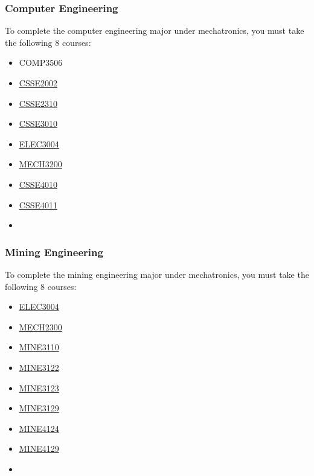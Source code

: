 \subsubsection{Computer Engineering}
To complete the computer engineering major under mechatronics, you must take the following 8 courses:
\begin{multicols}{3}
    \begin{itemize}
        \item COMP3506
        \item \hyperlink{CSSE2002}{CSSE2002}
        \item \hyperlink{CSSE2310}{CSSE2310}
        \item \hyperlink{CSSE3010}{CSSE3010}
        \item \hyperlink{ELEC3004}{ELEC3004}
        \item \hyperlink{MECH3200}{MECH3200}
        \item \hyperlink{CSSE4010}{CSSE4010}
        \item \hyperlink{CSSE4011}{CSSE4011}
        \item[]
    \end{itemize}
\end{multicols}

\subsubsection{Mining Engineering}
To complete the mining engineering major under mechatronics, you must take the following 8 courses:
\begin{multicols}{3}
    \begin{itemize}
        \item \hyperlink{ELEC3004}{ELEC3004}
        \item \hyperlink{MECH2300}{MECH2300}
        \item \hyperlink{MINE3110}{MINE3110}
        \item \hyperlink{MINE3122}{MINE3122}
        \item \hyperlink{MINE3123}{MINE3123}
        \item \hyperlink{MINE3129}{MINE3129}
        \item \hyperlink{MINE4124}{MINE4124}
        \item \hyperlink{MINE4129}{MINE4129}
        \item[]
    \end{itemize}
\end{multicols}


